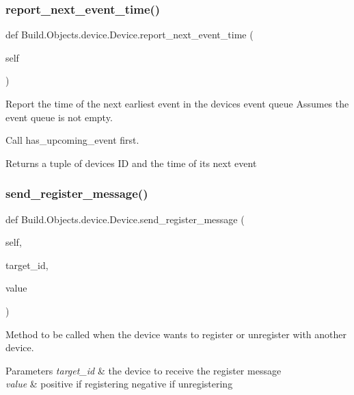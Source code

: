\subsubsection{\texorpdfstring{report\+\_\+next\+\_\+event\+\_\+time()}{report\_next\_event\_time()}}
{\footnotesize\ttfamily def Build.\+Objects.\+device.\+Device.\+report\+\_\+next\+\_\+event\+\_\+time (\begin{DoxyParamCaption}\item[{}]{self }\end{DoxyParamCaption})}



Report the time of the next earliest event in the device\textquotesingle{}s event queue Assumes the event queue is not empty. 

Call has\+\_\+upcoming\+\_\+event first. \begin{DoxyReturn}{Returns}
a tuple of device\textquotesingle{}s ID and the time of its next event 
\end{DoxyReturn}
\mbox{\label{class_build_1_1_objects_1_1device_1_1_device_a0acf2d71b9378f7f59e99c1b06c3c23a}} 
\subsubsection{\texorpdfstring{send\+\_\+register\+\_\+message()}{send\_register\_message()}}
{\footnotesize\ttfamily def Build.\+Objects.\+device.\+Device.\+send\+\_\+register\+\_\+message (\begin{DoxyParamCaption}\item[{}]{self,  }\item[{}]{target\+\_\+id,  }\item[{}]{value }\end{DoxyParamCaption})}



Method to be called when the device wants to register or unregister with another device. 


\begin{DoxyParams}{Parameters}
{\em target\+\_\+id} & the device to receive the register message \\
\hline
{\em value} & positive if registering negative if unregistering \\
\hline
\end{DoxyParams}
\mbox{\label{class_build_1_1_objects_1_1device_1_1_device_a1cfab902786e2a6caf3a4b22341e9641}} 
